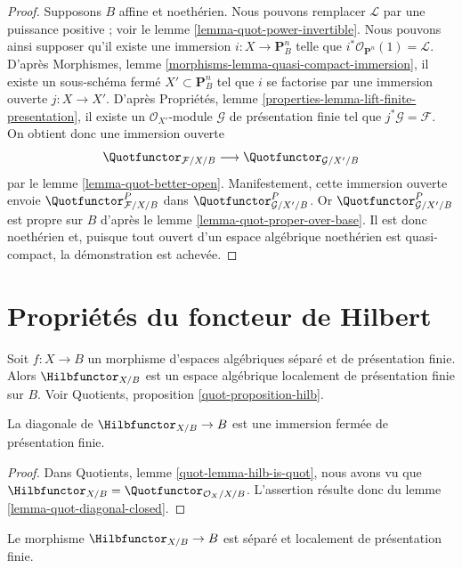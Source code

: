 \begin{proof}
\medskip\noindent
Supposons $B$ affine et noethérien. Nous pouvons remplacer $\mathcal{L}$
par une puissance positive ; voir le lemme
\ref{lemma-quot-power-invertible}.
Nous pouvons ainsi supposer qu'il existe une immersion
$i : X \to \mathbf{P}^n_B$ telle que
$i^*\mathcal{O}_{\mathbf{P}^n}(1) = \mathcal{L}$.
D'après Morphismes, lemme
\ref{morphisms-lemma-quasi-compact-immersion}, il existe un sous-schéma
fermé $X' \subset \mathbf{P}^n_B$ tel que $i$ se factorise par une
immersion ouverte $j : X \to X'$.
D'après Propriétés, lemme
\ref{properties-lemma-lift-finite-presentation}, il existe un
$\mathcal{O}_{X'}$-module $\mathcal{G}$ de présentation finie tel que
$j^*\mathcal{G} = \mathcal{F}$. On obtient donc une immersion ouverte
$$
\Quotfunctor_{\mathcal{F}/X/B}
\longrightarrow
\Quotfunctor_{\mathcal{G}/X'/B}
$$
par le lemme \ref{lemma-quot-better-open}. Manifestement, cette immersion
ouverte envoie $\Quotfunctor^P_{\mathcal{F}/X/B}$ dans
$\Quotfunctor^P_{\mathcal{G}/X'/B}$. Or
$\Quotfunctor^P_{\mathcal{G}/X'/B}$ est propre sur $B$ d'après le lemme
\ref{lemma-quot-proper-over-base}.
Il est donc noethérien et, puisque tout ouvert d'un espace algébrique
noethérien est quasi-compact, la démonstration est achevée.
\end{proof}




\section{Propriétés du foncteur de Hilbert}
\label{section-hilb}

\noindent
Soit $f : X \to B$ un morphisme d'espaces algébriques séparé et de
présentation finie. Alors $\Hilbfunctor_{X/B}$ est un espace algébrique
localement de présentation finie sur $B$. Voir Quotients, proposition
\ref{quot-proposition-hilb}.

\begin{lemma}
\label{lemma-hilb-diagonal-closed}
La diagonale de $\Hilbfunctor_{X/B} \to B$ est une immersion fermée de
présentation finie.
\end{lemma}

\begin{proof}
Dans Quotients, lemme \ref{quot-lemma-hilb-is-quot}, nous avons vu que
$\Hilbfunctor_{X/B} = \Quotfunctor_{\mathcal{O}_X/X/B}$.
L'assertion résulte donc du lemme \ref{lemma-quot-diagonal-closed}.
\end{proof}

\begin{lemma}
\label{lemma-hilb-s-lfp}
Le morphisme $\Hilbfunctor_{X/B} \to B$ est séparé et localement de
présentation finie.
\end{lemma}


